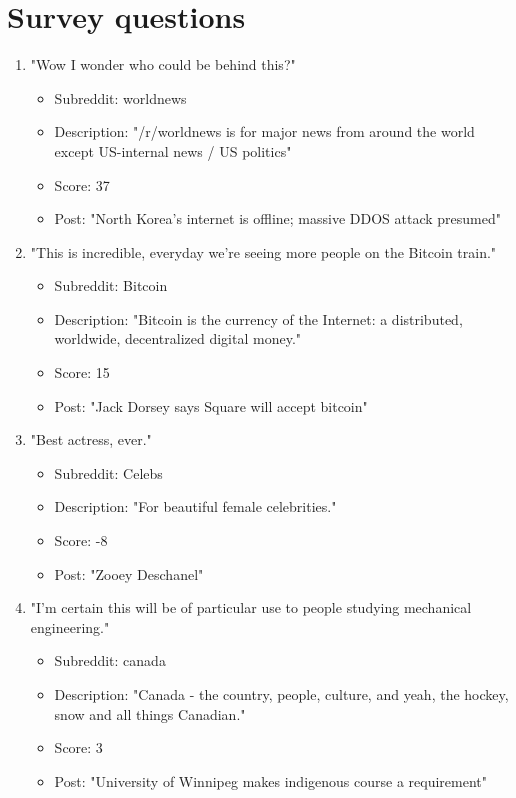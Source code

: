 \documentclass[a4paper,12pt]{article}
\begin{document}
\section{Survey questions}
\begin{enumerate}
	\item "Wow I wonder who could be behind this?"
	\begin{itemize}
		\item Subreddit: worldnews
		\item Description: "/r/worldnews is for major news from around the world except US-internal news / US politics"
		\item Score: 37
		\item Post: "North Korea's internet is offline; massive DDOS attack presumed"
	\end{itemize}

	\item "This is incredible, everyday we're seeing more people on the Bitcoin train."
	\begin{itemize}
		\item Subreddit: Bitcoin
		\item Description: "Bitcoin is the currency of the Internet: a distributed, worldwide, decentralized digital money."
		\item Score: 15
		\item Post: "Jack Dorsey says Square will accept bitcoin"
	\end{itemize}

	\item "Best actress, ever."
	\begin{itemize}
		\item Subreddit: Celebs
		\item Description: "For beautiful female celebrities."
		\item Score: -8
		\item Post: "Zooey Deschanel"
	\end{itemize}

	\item "I'm certain this will be of particular use to people studying mechanical engineering."
	\begin{itemize}
		\item Subreddit: canada
		\item Description: "Canada - the country, people, culture, and yeah, the hockey, snow and all things Canadian."
		\item Score: 3
		\item Post: "University of Winnipeg makes indigenous course a requirement"
	\end{itemize}


\end{enumerate}
\end{document}
